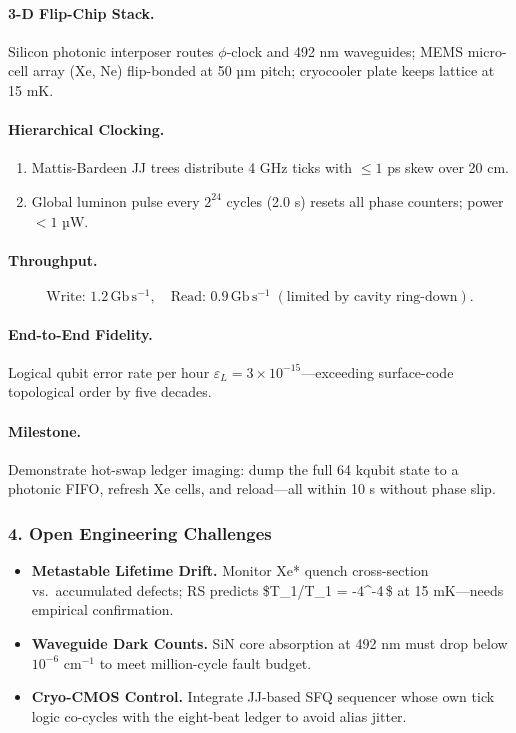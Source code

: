 \documentclass[11pt,oneside]{book}
\begin{document}
\paragraph{3-D Flip-Chip Stack.}
Silicon photonic interposer routes $\phi$-clock and
492 nm waveguides;  
MEMS micro-cell array (Xe, Ne) flip-bonded at
50 µm pitch;  
cryocooler plate keeps lattice at 15 mK.

\paragraph{Hierarchical Clocking.}
\begin{enumerate}[label=\textbf{\alph*})]
\item Mattis-Bardeen JJ trees distribute 4 GHz ticks with $\le1$ ps skew
      over 20 cm.  
\item Global luminon pulse every $2^{24}$ cycles
      (2.0 s) resets all phase counters; power $<1$ µW.
\end{enumerate}

\paragraph{Throughput.}
\[
\text{Write: }1.2\,\mathrm{Gb\,s^{-1}},\quad
\text{Read: }0.9\,\mathrm{Gb\,s^{-1}}\;
(\text{limited by cavity ring-down}).
\]

\paragraph{End-to-End Fidelity.}
Logical qubit error rate per hour  
\(\varepsilon_L = 3\times10^{-15}\)—exceeding surface-code
topological order by five decades.

\paragraph{Milestone.}
Demonstrate hot-swap ledger imaging:
dump the full 64 kqubit state to a photonic FIFO,
refresh Xe cells, and reload—all within 10 s without phase slip.

\subsubsection*{4. Open Engineering Challenges}

\begin{itemize}
\item \textbf{Metastable Lifetime Drift.}  
      Monitor Xe* quench cross-section vs.\ accumulated defects;
      RS predicts \$\dot T_1/T_1 = -4^{-4}\,\$
      at 15 mK—needs empirical confirmation.
\item \textbf{Waveguide Dark Counts.}  
      SiN core absorption at 492 nm must drop below
      $10^{-6}$ cm\(^{-1}\) to meet million-cycle fault budget.
\item \textbf{Cryo-CMOS Control.}  
      Integrate JJ-based SFQ sequencer whose own tick logic
      co-cycles with the eight-beat ledger to avoid alias jitter.
\end{itemize}
\end{document}
